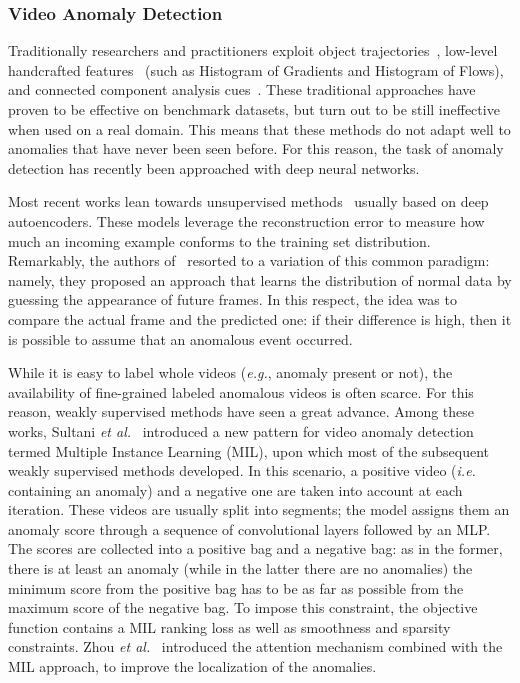 \documentclass[runningheads]{llncs}
\begin{document}
\subsubsection{Video Anomaly Detection}
Traditionally researchers and practitioners exploit object trajectories~\cite{calderara2011detecting, morris2011trajectory,monti2022many}, low-level handcrafted features~\cite{benezeth2009abnormal, kim2009observe, mehran2009abnormal} (such as Histogram of Gradients and Histogram of Flows), and connected component analysis cues~\cite{amraee2018anomaly,bolelli2019spaghetti,bolelli2021one}. These traditional approaches have proven to be effective on benchmark datasets, but turn out to be still ineffective when used on a real domain. This means that these methods do not adapt well to anomalies that have never been seen before. For this reason, the task of anomaly detection has recently been approached with deep neural networks.

Most recent works lean towards unsupervised methods~\cite{hasan2016learning,abati2019latent} usually based on deep autoencoders. These models leverage the reconstruction error to measure how much an incoming example conforms to the training set distribution. Remarkably, the authors of~\cite{liu2018future} resorted to a variation of this common paradigm: namely, they proposed an approach that learns the distribution of normal data by guessing the appearance of future frames. In this respect, the idea was to compare the actual frame and the predicted one: if their difference is high, then it is possible to assume that an anomalous event occurred.

While it is easy to label whole videos (\textit{e.g.}, anomaly present or not), the availability of fine-grained labeled anomalous videos is often scarce. For this reason, weakly supervised methods have seen a great advance. Among these works, Sultani \textit{et al.}~\cite{sultani2018real} introduced a new pattern for video anomaly detection termed Multiple Instance Learning (MIL), upon which most of the subsequent weakly supervised methods developed. In this scenario, a positive video (\textit{i.e.} containing an anomaly) and a negative one are taken into account at each iteration. These videos are usually split into segments; the model assigns them an anomaly score through a sequence of convolutional layers followed by an MLP. The scores are collected into a positive bag and a negative bag: as in the former, there is at least an anomaly (while in the latter there are no anomalies) the minimum score from the positive bag has to be as far as possible from the maximum score of the negative bag. To impose this constraint, the objective function contains a MIL ranking loss as well as smoothness and sparsity constraints. Zhou \textit{et al.}~\cite{zhu2019motion} introduced the attention mechanism combined with the MIL approach, to improve the localization of the anomalies.
\end{document}
